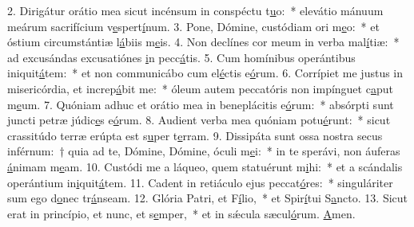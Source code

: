 2. Dirigátur orátio mea sicut incénsum in conspéctu t\uline{u}o:~* elevátio mánuum meárum sacrifícium v\uline{e}spert\uline{í}num.
3. Pone, Dómine, custódiam ori m\uline{e}o:~* et óstium circumstántiæ l\uline{á}biis m\uline{e}is.
4. Non declínes cor meum in verba mal\uline{í}tiæ:~* ad excusándas excusatiónes \uline{i}n pecc\uline{á}tis.
5. Cum homínibus operántibus iniquit\uline{á}tem:~* et non communicábo cum el\uline{é}ctis e\uline{ó}rum.
6. Corrípiet me justus in misericórdia, et increp\uline{á}bit me:~* óleum autem peccatóris non impínguet c\uline{a}put m\uline{e}um.
7. Quóniam adhuc et orátio mea in beneplácitis e\uline{ó}rum:~* absórpti sunt juncti petræ júdic\uline{e}s e\uline{ó}rum.
8. Audient verba mea quóniam potu\uline{é}runt:~* sicut crassitúdo terræ erúpta est s\uline{u}per t\uline{e}rram.
9. Dissipáta sunt ossa nostra secus inférnum:~† quia ad te, Dómine, Dómine, óculi m\uline{e}i:~* in te sperávi, non áuferas \uline{á}nimam m\uline{e}am.
10. Custódi me a láqueo, quem statuérunt m\uline{i}hi:~* et a scándalis operántium in\uline{i}quit\uline{á}tem.
11. Cadent in retiáculo ejus peccat\uline{ó}res:~* singuláriter sum ego d\uline{o}nec tr\uline{á}nseam.
12. Glória Patri, et F\uline{í}lio,~* et Spir\uline{í}tui S\uline{a}ncto.
13. Sicut erat in princípio, et nunc, et s\uline{e}mper,~* et in sǽcula sæcul\uline{ó}rum. \uline{A}men.

